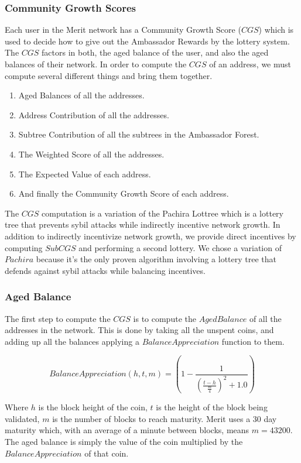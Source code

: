 \documentclass{article}
\begin{document}
\subsubsection{Community Growth Scores}

Each user in the Merit network has a Community Growth Score ($CGS$) which is
used to decide how to give out the Ambassador Rewards by the lottery system. 
The $CGS$ factors in both, the aged balance of the user, and also the aged balances
of their network.  In order to compute the $CGS$ of an address, we must compute several 
different things and bring them together.

\begin{enumerate}
    \item Aged Balances of all the addresses.
    \item Address Contribution of all the addresses.
    \item Subtree Contribution of all the subtrees in the Ambassador Forest.
    \item The Weighted Score of all the addresses.
    \item The Expected Value of each address.
    \item And finally the Community Growth Score of each address.
\end{enumerate}

The $CGS$ computation is a variation of the Pachira Lottree \cite{pachira} which
is a lottery tree that prevents sybil attacks while indirectly incentive network growth.
In addition to indirectly incentivize network growth, we provide direct incentives
by computing $SubCGS$ and performing a second lottery.  We chose a variation of
$Pachira$ because it's the only proven algorithm involving a lottery tree that 
defends against sybil attacks while balancing incentives.

\subsubsection{Aged Balance}

The first step to compute the $CGS$ is to compute the $AgedBalance$ of all the addresses
in the network.  This is done by taking all the unspent coins, and adding up all the
balances applying a $BalanceAppreciation$ function to them.

$$BalanceAppreciation(h,t,m) = (1 - \frac{1}{(\frac{t-h}{\frac{m}{4}})^2 + 1.0})$$

Where $h$ is the block height of the coin, $t$ is the height of the block being
validated, $m$ is the number of blocks to reach maturity.  Merit uses a 30 day
maturity which, with an average of a minute between blocks, means $m = 43200$.
The aged balance is simply the value of the coin multiplied by the
$BalanceAppreciation$ of that coin.
\end{document}
